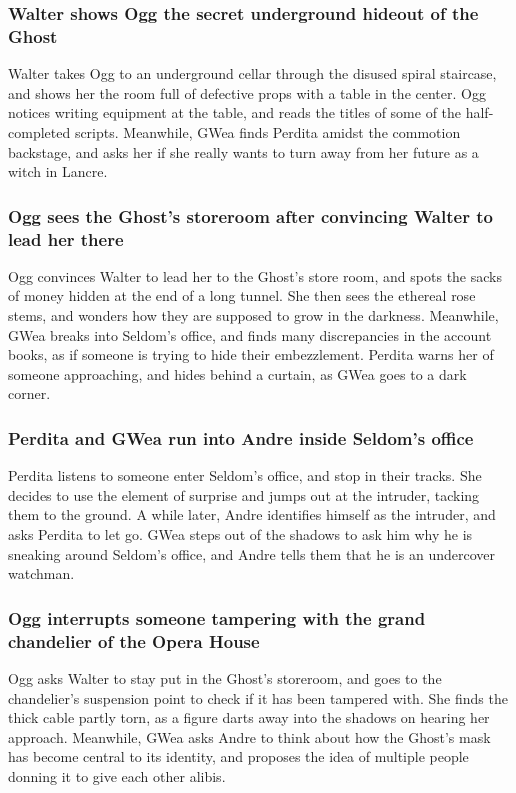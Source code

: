 \subsubsection{\Gls{Walter} shows \Gls{Ogg} the secret underground hideout of the \Gls{Ghost}}
\Gls{Walter} takes \Gls{Ogg} to an underground cellar through the disused spiral staircase, and 
shows her the room full of defective props with a table in the center. \Gls{Ogg} notices writing 
equipment at the table, and reads the titles of some of the half-completed scripts. Meanwhile, 
\Gls{GWea} finds \Gls{Perdita} amidst the commotion backstage, and asks her if she really wants to 
turn away from her future as a witch in Lancre.

\subsubsection{\Gls{Ogg} sees the \Gls{Ghost}'s storeroom after convincing \Gls{Walter} to lead 
her there}
\Gls{Ogg} convinces \Gls{Walter} to lead her to the \Gls{Ghost}'s store room, and spots the sacks 
of money hidden at the end of a long tunnel. She then sees the ethereal rose stems, and wonders how 
they are supposed to grow in the darkness. Meanwhile, \Gls{GWea} breaks into \Gls{Seldom}'s office, 
and finds many discrepancies in the account books, as if someone is trying to hide their 
embezzlement. \Gls{Perdita} warns her of someone approaching, and hides behind a curtain, as 
\Gls{GWea} goes to a dark corner.

\subsubsection{\Gls{Perdita} and \Gls{GWea} run into \Gls{Andre} inside \Gls{Seldom}'s office}
\Gls{Perdita} listens to someone enter \Gls{Seldom}'s office, and stop in their tracks. She decides 
to use the element of surprise and jumps out at the intruder, tacking them to the ground. A while 
later, \Gls{Andre} identifies himself as the intruder, and asks \Gls{Perdita} to let go. \Gls{GWea}
steps out of the shadows to ask him why he is sneaking around \Gls{Seldom}'s office, and \Gls{Andre}
tells them that he is an undercover watchman.

\subsubsection{\Gls{Ogg} interrupts someone tampering with the grand chandelier of the Opera House}
\Gls{Ogg} asks \Gls{Walter} to stay put in the \Gls{Ghost}'s storeroom, and goes to the chandelier's 
suspension point to check if it has been tampered with. She finds the thick cable partly torn, 
as a figure darts away into the shadows on hearing her approach. Meanwhile, \Gls{GWea} asks 
\Gls{Andre} to think about how the \Gls{Ghost}'s mask has become central to its identity, and
proposes the idea of multiple people donning it to give each other alibis.

